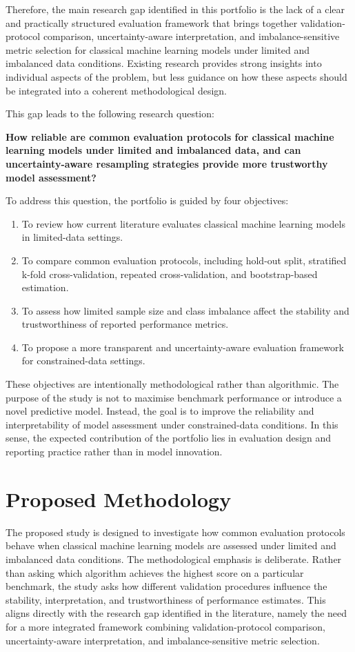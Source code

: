 \documentclass[11pt,a4paper]{article}
\begin{document}
Therefore, the main research gap identified in this portfolio is the lack of a clear and practically structured evaluation framework that brings together validation-protocol comparison, uncertainty-aware interpretation, and imbalance-sensitive metric selection for classical machine learning models under limited and imbalanced data conditions. Existing research provides strong insights into individual aspects of the problem, but less guidance on how these aspects should be integrated into a coherent methodological design.

This gap leads to the following research question:

\textbf{How reliable are common evaluation protocols for classical machine learning models under limited and imbalanced data, and can uncertainty-aware resampling strategies provide more trustworthy model assessment?}

To address this question, the portfolio is guided by four objectives:
\begin{enumerate}[label=\arabic*.]
    \item To review how current literature evaluates classical machine learning models in limited-data settings.
    \item To compare common evaluation protocols, including hold-out split, stratified k-fold cross-validation, repeated cross-validation, and bootstrap-based estimation.
    \item To assess how limited sample size and class imbalance affect the stability and trustworthiness of reported performance metrics.
    \item To propose a more transparent and uncertainty-aware evaluation framework for constrained-data settings.
\end{enumerate}

These objectives are intentionally methodological rather than algorithmic. The purpose of the study is not to maximise benchmark performance or introduce a novel predictive model. Instead, the goal is to improve the reliability and interpretability of model assessment under constrained-data conditions. In this sense, the expected contribution of the portfolio lies in evaluation design and reporting practice rather than in model innovation.

\section{Proposed Methodology}

The proposed study is designed to investigate how common evaluation protocols behave when classical machine learning models are assessed under limited and imbalanced data conditions. The methodological emphasis is deliberate. Rather than asking which algorithm achieves the highest score on a particular benchmark, the study asks how different validation procedures influence the stability, interpretation, and trustworthiness of performance estimates. This aligns directly with the research gap identified in the literature, namely the need for a more integrated framework combining validation-protocol comparison, uncertainty-aware interpretation, and imbalance-sensitive metric selection.
\end{document}
